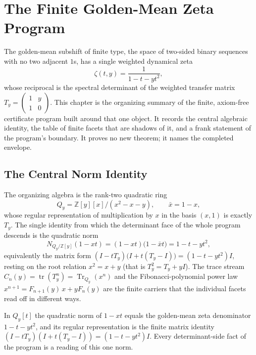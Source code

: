 \chapter{The Finite Golden-Mean Zeta Program}
\label{ch:concrete-instances-window6-golden-mean-zeta-program-hub}

The golden-mean subshift of finite type, the space of two-sided binary sequences with no two adjacent $1$s, has a single weighted dynamical zeta
$$
\zeta(t,y)=\frac{1}{1-t-yt^2},
$$
whose reciprocal is the spectral determinant of the weighted transfer matrix $T_y=\begin{pmatrix}1&y\\1&0\end{pmatrix}$. This chapter is the organizing summary of the finite, axiom-free certificate program built around that one object. It records the central algebraic identity, the table of finite facets that are shadows of it, and a frank statement of the program's boundary. It proves no new theorem; it names the completed envelope.

\section{The Central Norm Identity}
\label{sec:window6-zeta-program-central}

The organizing algebra is the rank-two quadratic ring
$$
Q_y=\mathbb Z[y][x]/(x^2-x-y),\qquad \bar x=1-x,
$$
whose regular representation of multiplication by $x$ in the basis $(x,1)$ is exactly $T_y$. The single identity from which the determinant face of the whole program descends is the quadratic norm
$$
N_{Q_y/\mathbb Z[y]}(1-xt)=(1-xt)\bigl(1-\bar x t\bigr)=1-t-yt^2,
$$
equivalently the matrix form $(I-tT_y)\bigl(I+t(T_y-I)\bigr)=(1-t-yt^2)I$, resting on the root relation $x^2=x+y$ (that is $T_y^2=T_y+yI$). The trace stream $C_n(y)=\operatorname{tr}(T_y^n)=\operatorname{Tr}_{Q_y}(x^n)$ and the Fibonacci-polynomial power law $x^{n+1}=F_{n+1}(y)\,x+yF_n(y)$ are the finite carriers that the individual facets read off in different ways.

\begin{theorem}
\label{thm:window6-zeta-program-norm}
In $Q_y[t]$ the quadratic norm of $1-xt$ equals the golden-mean zeta denominator $1-t-yt^2$, and its regular representation is the finite matrix identity $(I-tT_y)(I+t(T_y-I))=(1-t-yt^2)I$. Every determinant-side fact of the program is a reading of this one norm.
\end{theorem}

